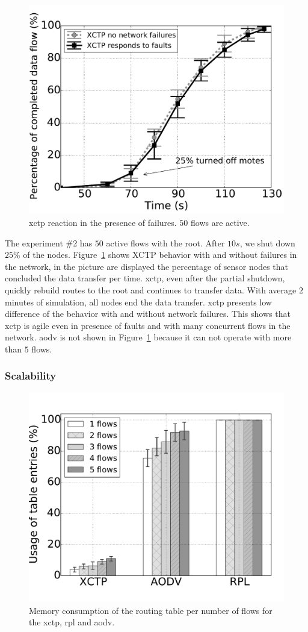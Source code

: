 \begin{figure}[t]
\centerline{
    \includegraphics[width=0.55\linewidth]{img/reacao-xctp}
} \caption{\ac{xctp} reaction in the presence of failures. $50$ flows are active.} \label{fig:reaction-xctp}
\end{figure}

The experiment \#2 has $50$ active flows with the root. After $10s$, we shut
down $25\%$ of the nodes. Figure~\ref{fig:reaction-xctp} shows XCTP behavior with and without failures in the network, in the picture are displayed the percentage of sensor nodes that concluded the data transfer per time. \ac{xctp}, even after the partial shutdown, quickly rebuild routes to the root and continues to transfer data. With average $2$ minutes of simulation, all nodes end the data transfer. \ac{xctp} presents low difference of the behavior with and without network failures. This shows that \ac{xctp} is agile even in presence of faults and with many concurrent flows in the network. \ac{aodv} is not shown in Figure~\ref{fig:reaction-xctp} because it can not operate with more than $5$ flows.

\subsubsection{Scalability}
\label{sec:scalability}

\begin{figure}[ht]
\centerline{
    \includegraphics[width=0.55\linewidth]{img/memory-xctp-aodv-rpl-bar}
} \caption{Memory consumption of the routing table per number of flows for the \ac{xctp}, \ac{rpl} and \ac{aodv}.} \label{fig:memory-xctp-aodv-rpl-bar}
\end{figure}


